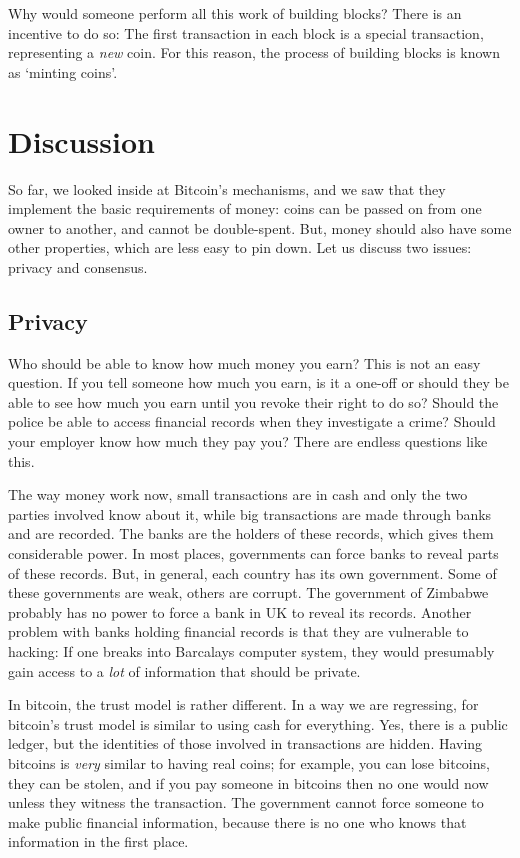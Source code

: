 Why would someone perform all this work of building blocks?
There is an incentive to do so:
The first transaction in each block is a special transaction, representing a \emph{new} coin.
For this reason, the process of building blocks is known as `minting coins'.



\section{Discussion}\label{sec:bitcoin-props}

So far, we looked inside at Bitcoin's mechanisms, and we saw that they implement the basic requirements of money: coins can be passed on from one owner to another, and cannot be double-spent.
But, money should also have some other properties, which are less easy to pin down.
Let us discuss two issues: privacy and consensus.

\subsection{Privacy}

Who should be able to know how much money you earn?
This is not an easy question.
If you tell someone how much you earn, is it a one-off or should they be able to see how much you earn until you revoke their right to do so?
Should the police be able to access financial records when they investigate a crime?
Should your employer know how much they pay you?
There are endless questions like this.

The way money work now, small transactions are in cash and only the two parties involved know about it, while big transactions are made through banks and are recorded.
The banks are the holders of these records, which gives them considerable power.
In most places, governments can force banks to reveal parts of these records.
But, in general, each country has its own government.
Some of these governments are weak, others are corrupt.
The government of Zimbabwe probably has no power to force a bank in UK to reveal its records.
Another problem with banks holding financial records is that they are vulnerable to hacking:
If one breaks into Barcalays computer system, they would presumably gain access to a \emph{lot} of information that should be private.

In bitcoin, the trust model is rather different.
In a way we are regressing, for bitcoin's trust model is similar to using cash for everything.
Yes, there is a public ledger, but the identities of those involved in transactions are hidden.
Having bitcoins is \emph{very} similar to having real coins; for example, you can lose bitcoins, they can be stolen, and if you pay someone in bitcoins then no one would now unless they witness the transaction.
The government cannot force someone to make public financial information, because there is no one who knows that information in the first place.

